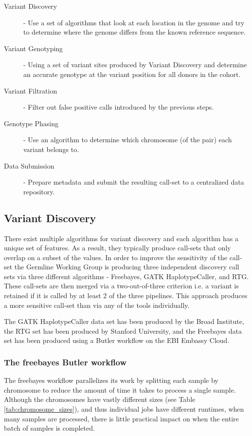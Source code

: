 \begin{description}
\item [Variant Discovery] - Use a set of algorithms that look at each location in the genome and try to determine where the genome differs from the known reference sequence.
\item [Variant Genotyping] - Using a set of variant sites produced by Variant Discovery and determine an accurate genotype at the variant position for all donors in the cohort.
\item [Variant Filtration] - Filter out false positive calls introduced by the previous steps.
\item [Genotype Phasing] - Use an algorithm to determine which chromosome (of the pair) each variant belongs to.
\item [Data Submission] - Prepare metadata and submit the resulting call-set to a centralized data repository.
\end{description}

\subsection{Variant Discovery}
\label{sec:variant_discovery}

There exist multiple algorithms for variant discovery and each algorithm has a unique set of features. As a result, they typically produce call-sets that only overlap on a subset of the values\autocite{li2014towards}. In order to improve the sensitivity of the call-set the Germline Working Group is producing three independent discovery call sets via three different algorithms - Freebayes\autocite{garrison2012haplotype}, GATK HaplotypeCaller\autocite{depristo2011framework}, and RTG\autocite{cleary2014joint}. These call-sets are then merged via a two-out-of-three criterion i.e. a variant is retained if it is called by at least 2 of the three pipelines. This approach produces a more sensitive call-set than via any of the tools individually.

The GATK HaplotypeCaller data set has been produced by the Broad Institute, the RTG set has been produced by Stanford University, and the Freebayes data set has been produced using a Butler workflow on the EBI Embassy Cloud.

\subsubsection{The freebayes Butler workflow}
The freebayes workflow parallelizes its work by splitting each sample by chromosome to reduce the amount of time it takes to process a single sample. Although the chromosomes have vastly different sizes (see Table \ref{tab:chromosome_sizes}), and thus individual jobs have different runtimes, when many samples are processed, there is little practical impact on when the entire batch of samples is completed.


